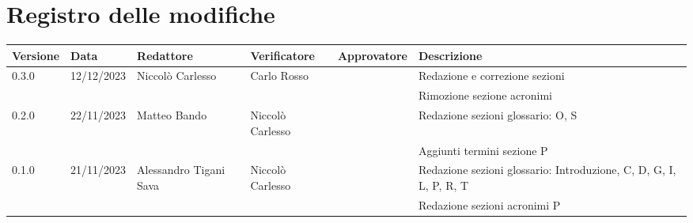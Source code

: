 \section*{Registro delle modifiche}
\begin{scriptsize}
	\begin{tabularx}{\textwidth}{lllllX}
		\textbf{Versione} 	& \textbf{Data} & \textbf{Redattore}	& \textbf{Verificatore} & \textbf{Approvatore} 	& \textbf{Descrizione}				\\
		\hline
		0.3.0				& 12/12/2023	& Niccolò Carlesso		& Carlo Rosso			&						& Redazione e correzione sezioni	\\
							&               &						&                       &                      	& Rimozione sezione acronimi		\\
		\hline
		0.2.0				& 22/11/2023    & Matteo Bando			& Niccolò Carlesso		&                      	& Redazione sezioni glossario: O, S 	\\
		                  	&               &						&                       &                      	& Aggiunti termini sezione P			\\
		\hline
		0.1.0				& 21/11/2023    & Alessandro Tigani Sava & Niccolò Carlesso		&                      	& Redazione sezioni glossario: Introduzione, C, D, G, I, L, P, R, T \\
		                  	&               &						&                       &                      	& Redazione sezioni acronimi P 	\\
		\hline
	\end{tabularx}
\end{scriptsize}
